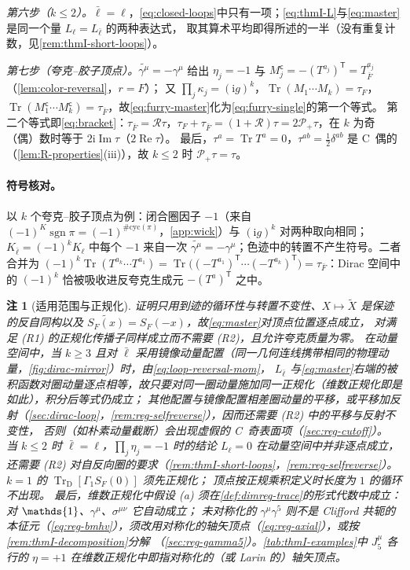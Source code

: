 \documentclass[UTF8,a4paper,11pt,fontset=fandol]{ctexart}
\makeatletter
\let\amsmathbb\mathbb
\renewcommand{\mathbb}[1]{\ifx1#1\mathds{1}\else\amsmathbb{#1}\fi}
\theoremstyle{cplain}
\theoremstyle{cdefinition}
\theoremstyle{cremark}
\newtheorem{remark}[theorem]{注}
\renewcommand{\proofname}{证明}
\renewenvironment{proof}[1][\proofname]{\par\pushQED{\qed}\normalfont\topsep6\p@\@plus6\p@\relax
  \trivlist\item[\hskip\labelsep\itshape #1\hspace{0.5em}]\ignorespaces}{\popQED\endtrivlist\@endpefalse}
\numberwithin{equation}{section}
\DeclareMathOperator{\Tr}{Tr}
\DeclareMathOperator{\Real}{Re}
\DeclareMathOperator{\Imag}{Im}
\newcommand{\TrD}{\operatorname{Tr}_{\mathrm{D}}}   %
\newcommand{\tp}{\mathsf{T}}                         %
\newcommand{\Rop}{\mathcal{R}}                       %
\newcommand{\Pp}{\mathcal{P}_{+}}                    %
\newcommand{\SF}{S_{F}}                              %
\newcommand{\ii}{\mathrm{i}}                        %
\newcommand{\Cconj}[1]{\widetilde{#1}}              %
\makeatother
\begin{document}
\begin{proof}[\cref{thm:furry-single}的证明]
\emph{第六步（$k\le2$）。}$\bar\ell=\ell$，\cref{eq:closed-loops}中只有一项；\cref{eq:thmI-L}与\cref{eq:master}是同一个量 $L_\ell=L_{\bar\ell}$ 的两种表达式，
取其算术平均即得所述的一半（没有重复计数，见\cref{rem:thmI-short-loops}）。

\emph{第七步（夸克--胶子顶点）。}$\Cconj{\gamma^\mu}=-\gamma^\mu$ 给出 $\eta_j=-1$ 与 $M_j^{\mathsf c}=-(T^{a_j})^{\tp}=T^{a_j}_{\bar F}$（\cref{lem:color-reversal}，$r=F$）；
又 $\prod_j\kappa_j=(\ii g)^k$，$\Tr(M_1\cdots M_k)=\tau_F$，$\Tr(M_1^{\mathsf c}\cdots M_k^{\mathsf c})=\tau_{\bar F}$，故\cref{eq:furry-master}化为\cref{eq:furry-single}的第一个等式。
第二个等式即\cref{eq:bracket}：$\tau_{\bar F}=\Rop\tau$，$\tau_F+\tau_{\bar F}=(1+\Rop)\tau=2\Pp\tau$，在 $k$ 为奇（偶）数时等于 $2\ii\Imag\tau$（$2\Real\tau$）。
最后，$\tau^a=\Tr T^a=0$，$\tau^{ab}=\frac12\delta^{ab}$ 是 C~偶的（\cref{lem:R-properties}(iii)），故 $k\le2$ 时 $\Pp\tau=\tau$。
\end{proof}

\paragraph{符号核对。}以 $k$ 个夸克--胶子顶点为例：闭合圈因子 $-1$（来自 $(-1)^K\operatorname{sgn}\pi=(-1)^{\#\mathrm{cyc}(\pi)}$，\cref{app:wick}）与 $(\ii g)^k$
对两种取向相同；$K_{\bar\ell}=(-1)^kK_\ell$ 中每个 $-1$ 来自一次 $\Cconj{\gamma^\mu}=-\gamma^\mu$；色迹中的转置不产生符号。二者合并为
$(-1)^k\Tr(T^{a_k}\cdots T^{a_1})=\Tr\bigl((-T^{a_1})^{\tp}\cdots(-T^{a_k})^{\tp}\bigr)=\tau_{\bar F}$：Dirac 空间中的 $(-1)^k$ 恰被吸收进反夸克生成元 $-(T^a)^{\tp}$ 之中。

\begin{remark}[适用范围与正规化]\label{rem:thmI-validity}
证明只用到迹的循环性与转置不变性、$X\mapsto\Cconj X$ 是保迹的反自同构以及 $\Cconj{\SF(x)}=\SF(-x)$，故\cref{eq:master}对顶点位置逐点成立，
对满足 (R1) 的正规化传播子同样成立而不需要 (R2)，且允许夸克质量为零。
在动量空间中，当 $k\ge3$ 且对 $\bar\ell$ 采用镜像动量配置（同一几何连线携带相同的物理动量，\cref{fig:dirac-mirror}）时，由\cref{eq:loop-reversal-mom}，
$L_{\bar\ell}$ 与\cref{eq:master}右端的被积函数对圈动量逐点相等，故只要对同一圈动量施加同一正规化（维数正规化即是如此），积分后等式仍成立；
其他配置与镜像配置相差圈动量的平移，或平移加反射（\cref{sec:dirac-loop}，\cref{rem:reg-selfreverse}），因而还需要 (R2) 中的平移与反射不变性，
否则（如朴素动量截断）会出现虚假的 C~奇表面项（\cref{sec:reg-cutoff}）。
当 $k\le2$ 时 $\bar\ell=\ell$，$\prod_j\eta_j=-1$ 时的结论 $L_\ell=0$ 在动量空间中并非逐点成立，还需要 (R2) 对自反向圈的要求（\cref{rem:thmI-short-loops}，\cref{rem:reg-selfreverse}）。$k=1$ 的 $\TrD[\Gamma_1\SF(0)]$ 须先正规化；
顶点按正规乘积定义时长度为 $1$ 的循环不出现。
最后，维数正规化中假设 (a) 须在\cref{def:dimreg-trace}的形式代数中成立：对 $\mathbb 1$、$\gamma^\mu$、$\sigma^{\mu\nu}$ 它自动成立；
未对称化的 $\gamma^\mu\gamma^5$ 则不是 Clifford 共轭的本征元（\cref{eq:reg-bmhv}），须改用对称化的轴矢顶点（\cref{eq:reg-axial}），或按\cref{rem:thmI-decomposition}分解
（\cref{sec:reg-gamma5}）。\cref{tab:thmI-examples}中 $J_5^\mu$ 各行的 $\eta=+1$ 在维数正规化中即指对称化的（或 Larin 的）轴矢顶点。
\end{remark}
\end{document}
